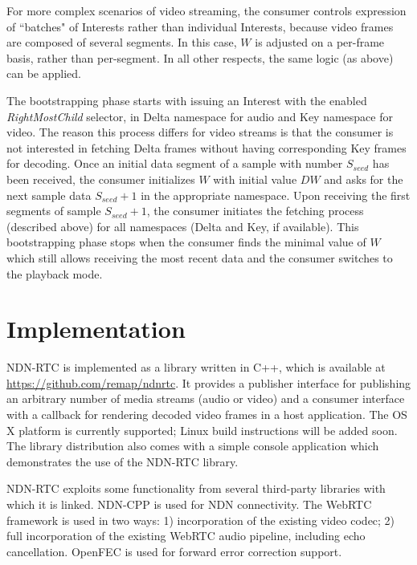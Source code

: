\documentclass{icn/sig-alternate-2012} %
\newcommand{\ndnrtcName}{NDN-RTC} %
\begin{document}
For more complex scenarios of video streaming, the consumer controls expression of ``batches" of Interests rather than individual Interests, because video frames are composed of several segments. In this case, $W$ is adjusted on a per-frame basis, rather than per-segment. In all other respects, the same logic (as above) can be applied.

The bootstrapping phase starts with issuing an Interest with the enabled \textit{RightMostChild} selector, in Delta namespace for audio and Key namespace for video. The reason this process differs for video streams is that the consumer is not interested in fetching Delta frames without having corresponding Key frames for decoding. Once an initial data segment of a sample with number $S_{seed}$ has been received, the consumer initializes $W$ with initial value $DW$ and asks for the next sample data $S_{seed}+1$ in the appropriate namespace. Upon receiving the first segments of sample $S_{seed}+1$, the consumer initiates the fetching process (described above) for all namespaces (Delta and Key, if available). This bootstrapping phase stops when the consumer finds the minimal value of $W$ which still allows receiving the most recent data and the consumer switches to the playback mode.


\section{Implementation}
\label{sec:imp}
\ndnrtcName{} is implemented as a library written in C++, which is available at \url{https://github.com/remap/ndnrtc}. 
It provides a publisher interface for publishing an arbitrary number of media streams (audio or video) and a consumer interface with a callback for rendering decoded video frames in a host application. The OS X platform is currently supported; Linux build instructions will be added soon. 
The library distribution also comes with a simple console application which demonstrates the use of the \ndnrtcName{} library.

\ndnrtcName{} exploits some functionality from several third-party libraries with which it is linked. NDN-CPP \cite{ndnccl} is used for NDN connectivity. The WebRTC framework \cite{webrtc} is used in two ways: 1) incorporation of the existing video codec; 2) full incorporation of the existing WebRTC audio pipeline, including echo cancellation. OpenFEC \cite{openfec} is used for forward error correction support. 
\end{document}

